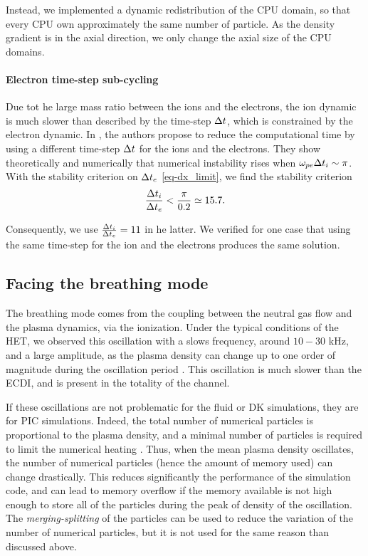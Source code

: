 Instead, we implemented a dynamic redistribution of the CPU domain, so that every CPU own approximately the same number of particle.
As the density gradient is in the axial direction, we only change the axial size of the CPU domains.

\paragraph{Electron time-step sub-cycling\\}
Due tot he large mass ratio between the  ions and the electrons, the ion dynamic is much slower than described by the time-step $\Delta t$, which is constrained by the electron dynamic.
In \citet{adam1982}, the authors propose to reduce the computational time by using a different time-step $\Delta t$ for the ions and the electrons.
They show theoretically and numerically that numerical instability rises when $\omega_{pe} \Delta t_i  \sim \pi$.
With the stability criterion on $\Delta t_e$ \cref{eq-dx_limit}, we find the stability criterion 
\begin{equation} \label{eq-subcycling_criterion}
  \frac{\Delta t_i}{\Delta t_e} < \frac{\pi}{0.2} \simeq 15.7.
\end{equation}

Consequently, we use $\frac{\Delta t_i}{\Delta t_e} = 11$ in he latter.
We verified for one case that using the same time-step for the ion and the electrons produces the same solution.


\subsection{Facing the breathing mode} \label{subsec-breathmod}
The breathing mode comes from the coupling between the neutral gas flow and the plasma dynamics, via the ionization.
Under the typical conditions of the \ac{HET}, we observed this oscillation with a slows frequency, around  $10-30$ kHz, and a large amplitude, as the plasma density can change up to one order of magnitude during the oscillation period \citep{barral2003a,barral2009}.
This oscillation is much slower than the \ac{ECDI}, and is present in the totality of the channel.

If these oscillations are not problematic for the fluid or \ac{DK} simulations, they are for \ac{PIC} simulations.
Indeed, the total number of numerical particles is proportional to the plasma density, and a minimal number of particles is required to limit the numerical heating \citep{turner2006}.
Thus, when the mean plasma density oscillates, the number of numerical particles (hence the amount of memory used) can change drastically.
This reduces significantly the performance of the simulation code, and can lead to memory overflow if the memory available is not high enough to store all of the particles during the peak of density  of the oscillation.
The \emph{merging-splitting} of the particles  can be used to reduce the variation of the number of numerical particles, but it is not used for the same reason than discussed above.

